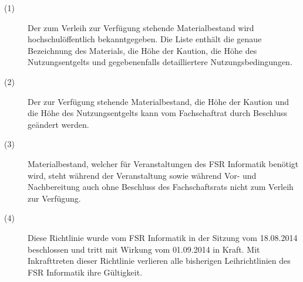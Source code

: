 \documentclass[a4paper]{article}
\newcommand{\iFSR}{FSR Informatik}
\begin{document}
\begin{description}
\item[(1)] Der zum Verleih zur Verfügung stehende Materialbestand wird hochschulöffentlich bekanntgegeben. Die Liste enthält die genaue Bezeichnung des Materials, die Höhe der Kaution, die Höhe des Nutzungsentgelts und gegebenenfalls detailliertere Nutzungsbedingungen.
\item[(2)] Der zur Verfügung stehende Materialbestand, die Höhe der Kaution und die Höhe des Nutzungsentgelts kann vom Fachschaftrat durch Beschluss geändert werden.
\item[(3)] Materialbestand, welcher für Veranstaltungen des \iFSR{} benötigt wird, steht während der Veranstaltung sowie während Vor- und Nachbereitung auch ohne Beschluss des Fachschaftsrats nicht zum Verleih zur Verfügung.
\item[(4)] Diese Richtlinie wurde vom \iFSR{} in der Sitzung vom 18.08.2014 beschlossen und tritt mit Wirkung vom 01.09.2014 in Kraft. Mit Inkrafttreten dieser Richtlinie verlieren alle bisherigen Leihrichtlinien des \iFSR{} ihre Gültigkeit.

\end{description}
\end{document}
